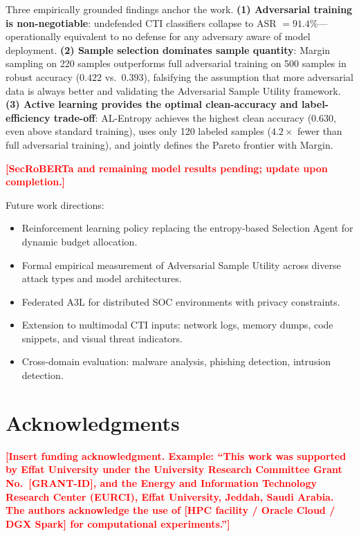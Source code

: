 \documentclass[review,1p,times,number]{elsarticle}
\newcommand{\TODO}[1]{\textcolor{red}{\textbf{[#1]}}}
\begin{document}
Three empirically grounded findings anchor the work.
\textbf{(1) Adversarial training is non-negotiable}: undefended CTI classifiers
collapse to ASR $= 91.4\%$---operationally equivalent to no defense for any
adversary aware of model deployment.
\textbf{(2) Sample selection dominates sample quantity}: Margin sampling on 220
samples outperforms full adversarial training on 500 samples in robust accuracy
($0.422$ vs.\ $0.393$), falsifying the assumption that more adversarial data is
always better and validating the Adversarial Sample Utility framework.
\textbf{(3) Active learning provides the optimal clean-accuracy and label-efficiency
trade-off}: AL-Entropy achieves the highest clean accuracy ($0.630$, even above
standard training), uses only 120 labeled samples ($4.2\times$ fewer than full
adversarial training), and jointly defines the Pareto frontier with Margin.

\TODO{SecRoBERTa and remaining model results pending; update upon completion.}

Future work directions:
\begin{itemize}[leftmargin=1.5em,itemsep=1pt]
  \item Reinforcement learning policy replacing the entropy-based Selection Agent
  for dynamic budget allocation.
  \item Formal empirical measurement of Adversarial Sample Utility across diverse
  attack types and model architectures.
  \item Federated A3L for distributed SOC environments with privacy constraints.
  \item Extension to multimodal CTI inputs: network logs, memory dumps, code
  snippets, and visual threat indicators.
  \item Cross-domain evaluation: malware analysis, phishing detection, intrusion
  detection.
\end{itemize}

\section*{Acknowledgments}
\TODO{Insert funding acknowledgment. Example: ``This work was supported by
Effat University under the University Research Committee Grant
No.\ \textcolor{red}{[GRANT-ID]}, and the Energy and Information Technology
Research Center (EURCI), Effat University, Jeddah, Saudi Arabia. The authors
acknowledge the use of \textcolor{red}{[HPC facility / Oracle Cloud / DGX Spark]}
for computational experiments.''}
\end{document}
